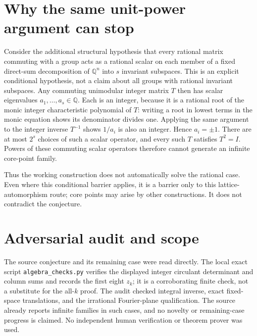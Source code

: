 \documentclass[11pt]{article}
\begin{document}
\section{Why the same unit-power argument can stop}
Consider the additional structural hypothesis that every rational matrix
commuting with a group acts as a rational scalar on each member of a fixed
direct-sum decomposition of $\mathbb Q^n$ into $s$ invariant subspaces.
This is an explicit conditional hypothesis, not a claim about all groups with
rational invariant subspaces. Any commuting unimodular integer matrix $T$
then has scalar eigenvalues $a_1,\ldots,a_s\in\mathbb Q$.
Each is an integer, because it is a rational root of the monic integer
characteristic polynomial of $T$: writing a root in lowest terms in the
monic equation shows its denominator divides one. Applying the same argument
to the integer inverse $T^{-1}$ shows $1/a_i$ is also an integer.
Hence $a_i=\pm1$. There are at most $2^s$ choices of such a scalar operator,
and every such $T$ satisfies $T^2=I$. Powers of these commuting scalar
operators therefore cannot generate an infinite core-point family.

Thus the working construction does not automatically solve the rational
case. Even where this conditional barrier applies, it is a barrier only to
this lattice-automorphism route; core points may arise by other constructions.
It does not contradict the conjecture.

\section{Adversarial audit and scope}
The source conjecture and its remaining case were read directly. The local
exact script \texttt{algebra\_checks.py} verifies the displayed integer
circulant determinant and column sums and records the first eight $z_k$;
it is a corroborating finite check, not a substitute for the all-$k$ proof.
The audit checked integral inverse, exact fixed-space translations, and the
irrational Fourier-plane qualification. The source already reports infinite
families in such cases, and no novelty or remaining-case progress is claimed.
No independent human verification or theorem prover was used.
\end{document}
